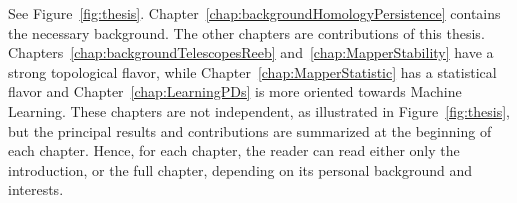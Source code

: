 See Figure~\ref{fig:thesis}.
Chapter~\ref{chap:backgroundHomologyPersistence} contains the necessary background. The other chapters are contributions of this thesis.
Chapters~\ref{chap:backgroundTelescopesReeb} and~\ref{chap:MapperStability} have a strong topological flavor, while Chapter~\ref{chap:MapperStatistic}
has a statistical flavor and Chapter~\ref{chap:LearningPDs} is more oriented towards Machine Learning.
These chapters are not independent, as illustrated in Figure~\ref{fig:thesis}, but the principal results and contributions are summarized at the beginning of each chapter. 
%
%
%
Hence, for each chapter, the reader can read either only the introduction, or the full chapter,
depending on its personal background and interests.  


